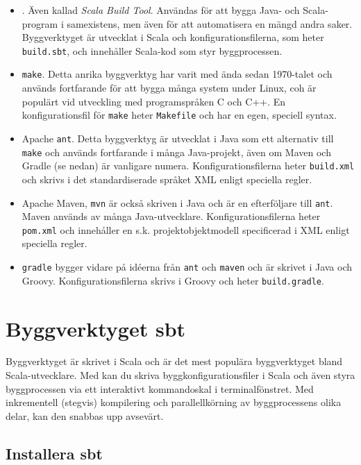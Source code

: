 \begin{itemize}
\item \sbt. Även kallad \textit{Scala Build Tool}. Användas för att bygga Java- och Scala-program i samexistens, men även för att automatisera en mängd andra saker. Byggverktyget är utvecklat i Scala och konfigurationsfilerna, som heter \texttt{build.sbt}, och innehåller Scala-kod som styr byggprocessen. 

\item \texttt{make}. Detta anrika byggverktyg har varit med ända sedan 1970-talet och används fortfarande för att bygga många system under Linux, coh är populärt vid utveckling med programspråken C och C++. En konfigurationsfil för \texttt{make} heter \texttt{Makefile} och har en egen, speciell syntax.

\item Apache \texttt{ant}. Detta byggverktyg är utvecklat i Java som ett alternativ till \texttt{make} och används fortfarande i många Java-projekt, även om Maven och Gradle (se nedan) är vanligare numera. Konfigurationsfilerna heter \texttt{build.xml} och skrivs i det standardiserade språket XML enligt  speciella regler.

\item Apache Maven, \texttt{mvn} är också skriven i Java och är en efterföljare till \texttt{ant}. Maven används av många Java-utvecklare. Konfigurationsfilerna heter \texttt{pom.xml} och innehåller en s.k. projektobjektmodell specificerad i XML enligt  speciella regler.

\item \texttt{gradle} bygger vidare på idéerna från \texttt{ant} och \texttt{maven} och är skrivet i Java och Groovy.  Konfigurationsfilerna skrivs i Groovy och heter \texttt{build.gradle}.  

\end{itemize} 

\section{Byggverktyget sbt}

Byggverktyget \sbt är skrivet i Scala och är det mest populära byggverktyget bland Scala-utvecklare. Med \sbt kan du skriva byggkonfigurationsfiler i Scala och även styra byggprocessen via ett interaktivt kommandoskal i terminalfönstret. Med inkrementell (stegvis) kompilering och parallellkörning av byggprocessens olika delar, kan den snabbas upp avsevärt.    


\subsection{Installera sbt}

